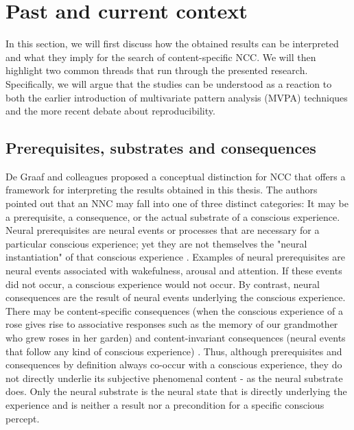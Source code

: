 \section{Past and current context}
In this section, we will first discuss how the obtained results can be interpreted and what they imply for the search of content-specific NCC. We will then highlight two common threads that run through the presented research. Specifically, we will argue that the studies can be understood as a reaction to both the earlier introduction of multivariate pattern analysis (MVPA) techniques and the more recent debate about reproducibility.

\subsection{Prerequisites, substrates and consequences}
De Graaf and colleagues \parencite*{DeGraaf2012} proposed a conceptual distinction for NCC that offers a framework for interpreting the results obtained in this thesis. The authors pointed out that an NNC may fall into one of three distinct categories: It may be a prerequisite, a consequence, or the actual substrate of a conscious experience. Neural prerequisites are neural events or processes that are necessary for a particular conscious experience; yet they are not themselves the "neural instantiation" of that conscious experience \parencite{DeGraaf2012}. Examples of neural prerequisites are neural events associated with wakefulness, arousal and attention. If these events did not occur, a conscious experience would not occur. By contrast, neural consequences are the result of neural events underlying the conscious experience. There may be content-specific consequences (when the conscious experience of a rose gives rise to associative responses such as the memory of our grandmother who grew roses in her garden) and content-invariant consequences (neural events that follow any kind of conscious experience) \parencite{DeGraaf2012}. Thus, although prerequisites and consequences by definition always co-occur with a conscious experience, they do not directly underlie its subjective phenomenal content - as the neural substrate does. Only the neural substrate is the neural state that is directly underlying the experience and is neither a result nor a precondition for a specific conscious percept.


